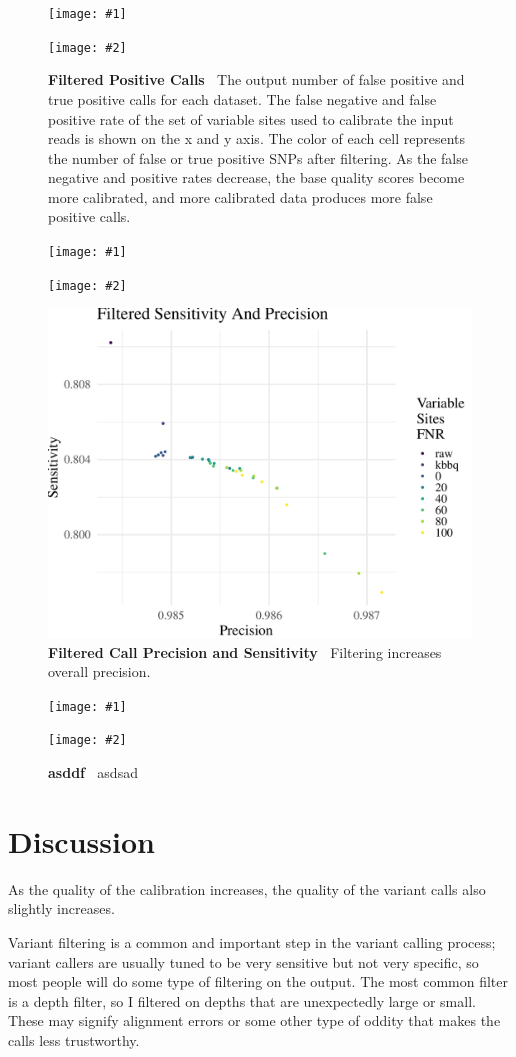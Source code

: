 \documentclass{report}
\newcommand{\titlecaption}[2]{\caption[#1]{\textbf{#1 \textbar\,} #2}}
\newcommand{\includetwo}[2]{\begin{minipage}{.45\textwidth}%
\texttt{[image: \#1]}%
\end{minipage}\hfill\begin{minipage}{.45\textwidth}%
\texttt{[image: \#2]}%
\end{minipage}}
\begin{document}
\begin{figure}
\centering
\includetwo{flt_fp_heatmap.pdf}{flt_tp_heatmap.pdf}
\titlecaption{Filtered Positive Calls}{The output number of false positive and true positive calls for each dataset. The false negative and false positive rate of the set of variable sites used to calibrate the input reads is shown on the x and y axis. The color of each cell represents the number of false or true positive SNPs after filtering. As the false negative and positive rates decrease, the base quality scores become more calibrated, and more calibrated data produces more false positive calls.}
\label{fig:vc_flt_p}
\end{figure}

\begin{figure}
\centering
\includetwo{flt_precision.pdf}{flt_sensitivity.pdf}
\includegraphics[width=.7\linewidth]{flt_sens_precision.pdf}
\titlecaption{Filtered Call Precision and Sensitivity}{Filtering increases overall precision.}
\label{fig:vc_flt_ps}
\end{figure}

\begin{figure}
\centering
\includetwo{flt_f_plot.pdf}{flt_f_heatmap.pdf}
\titlecaption{asddf}{asdsad}
\label{fig:vc_flt_f}
\end{figure}




\section{Discussion}
\begin{outline}
\item As the quality of the calibration increases, the quality of the variant calls also slightly increases.
\item Variant filtering is a common and important step in the variant calling process; variant callers are usually tuned to be very sensitive but not very specific, so most people will do some type of filtering on the output. The most common filter is a depth filter, so I filtered on depths that are unexpectedly large or small. These may signify alignment errors or some other type of oddity that makes the calls less trustworthy.
\end{outline}
\end{document}
